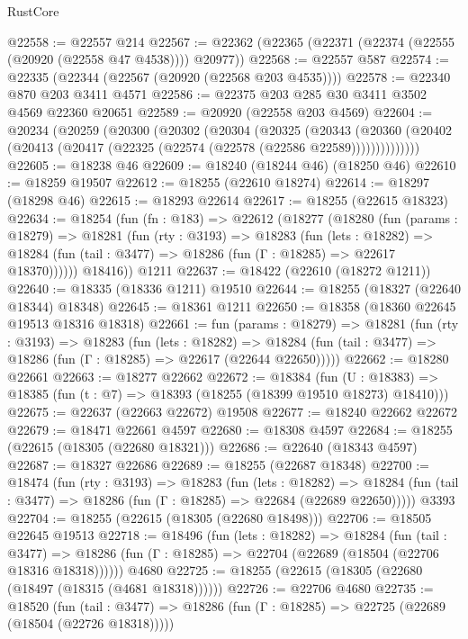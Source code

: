 \begin{lexlean}{RustCore}
\begin{coremodule}
@22558 := @22557 @214
@22567 := @22362 (@22365 (@22371 (@22374 (@22555 (@20920 (@22558 @47 @4538)))) @20977))
@22568 := @22557 @587
@22574 := @22335 (@22344 (@22567 (@20920 (@22568 @203 @4535))))
@22578 := @22340 @870 @203 @3411 @4571
@22586 := @22375 @203 @285 @30 @3411 @3502 @4569 @22360 @20651
@22589 := @20920 (@22558 @203 @4569)
@22604 := @20234
    (@20259
      (@20300
        (@20302
          (@20304
            (@20325
              (@20343
                (@20360 (@20402 (@20413 (@20417 (@22325 (@22574 (@22578 (@22586 @22589))))))))))))))
@22605 := @18238 @46
@22609 := @18240 (@18244 @46) (@18250 @46)
@22610 := @18259 @19507
@22612 := @18255 (@22610 @18274)
@22614 := @18297 (@18298 @46)
@22615 := @18293 @22614
@22617 := @18255 (@22615 @18323)
@22634 := @18254
    (fun (fn : @183) =>
    @22612
      (@18277
        (@18280
          (fun (params : @18279) =>
          @18281
            (fun (rty : @3193) =>
            @18283
              (fun (lets : @18282) =>
              @18284 (fun (tail : @3477) => @18286 (fun (Γ : @18285) => @22617 @18370))))))
        @18416))
    @1211
@22637 := @18422 (@22610 (@18272 @1211))
@22640 := @18335 (@18336 @1211) @19510
@22644 := @18255 (@18327 (@22640 @18344) @18348)
@22645 := @18361 @1211
@22650 := @18358 (@18360 @22645 @19513 @18316 @18318)
@22661 := fun (params : @18279) =>
  @18281
    (fun (rty : @3193) =>
    @18283
      (fun (lets : @18282) =>
      @18284 (fun (tail : @3477) => @18286 (fun (Γ : @18285) => @22617 (@22644 @22650)))))
@22662 := @18280 @22661
@22663 := @18277 @22662
@22672 := @18384
    (fun (U : @18383) => @18385 (fun (t : @7) => @18393 (@18255 (@18399 @19510 @18273) @18410)))
@22675 := @22637 (@22663 @22672) @19508
@22677 := @18240 @22662 @22672
@22679 := @18471 @22661 @4597
@22680 := @18308 @4597
@22684 := @18255 (@22615 (@18305 (@22680 @18321)))
@22686 := @22640 (@18343 @4597)
@22687 := @18327 @22686
@22689 := @18255 (@22687 @18348)
@22700 := @18474
    (fun (rty : @3193) =>
    @18283
      (fun (lets : @18282) =>
      @18284 (fun (tail : @3477) => @18286 (fun (Γ : @18285) => @22684 (@22689 @22650)))))
    @3393
@22704 := @18255 (@22615 (@18305 (@22680 @18498)))
@22706 := @18505 @22645 @19513
@22718 := @18496
    (fun (lets : @18282) =>
    @18284
      (fun (tail : @3477) =>
      @18286 (fun (Γ : @18285) => @22704 (@22689 (@18504 (@22706 @18316 @18318))))))
    @4680
@22725 := @18255 (@22615 (@18305 (@22680 (@18497 (@18315 (@4681 @18318))))))
@22726 := @22706 @4680
@22735 := @18520
    (fun (tail : @3477) => @18286 (fun (Γ : @18285) => @22725 (@22689 (@18504 (@22726 @18318)))))

\end{coremodule}
\end{lexlean}
